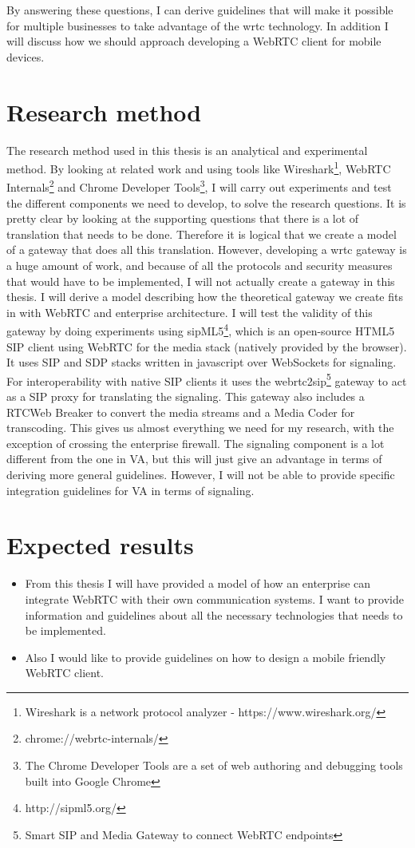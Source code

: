 By answering these questions, I can derive guidelines that will make it possible for multiple businesses to take advantage of the \gls{wrtc} technology. In addition I will discuss how we should approach developing a WebRTC client for mobile devices.


\section{Research method}
The research method used in this thesis is an analytical and experimental method. By looking at related work and using tools like Wireshark\footnote{Wireshark is a network protocol analyzer - https://www.wireshark.org/}, WebRTC Internals\footnote{chrome://webrtc-internals/} and Chrome Developer Tools\footnote{The Chrome Developer Tools are a set of web authoring and debugging tools built into Google Chrome}, I will carry out experiments and test the different components we need to develop, to solve the research questions. It is pretty clear by looking at the supporting questions that there is a lot of translation that needs to be done. Therefore it is logical that we create a model of a gateway that does all this translation. However, developing a \gls{wrtc} gateway is a huge amount of work, and because of all the protocols and security measures that would have to be implemented, I will not actually create a gateway in this thesis. I will derive a model describing how the theoretical gateway we create fits in with WebRTC and enterprise architecture. I will test the validity of this gateway by doing experiments using sipML5\footnote{http://sipml5.org/}, which is an open-source HTML5 SIP client using WebRTC for the media stack (natively provided by the browser). It uses SIP and SDP stacks written in javascript over WebSockets for signaling. For interoperability with native SIP clients it uses the webrtc2sip\footnote{Smart SIP and Media Gateway to connect WebRTC endpoints} gateway to act as a SIP proxy for translating the signaling. This gateway also includes a RTCWeb Breaker to convert the media streams and a Media Coder for transcoding. This gives us almost everything we need for my research, with the exception of crossing the enterprise firewall. The signaling component is a lot different from the one in VA, but this will just give an advantage in terms of deriving more general guidelines. However, I will not be able to provide specific integration guidelines for VA in terms of signaling.

\section{Expected results}

\begin{itemize}
    \item From this thesis I will have provided a model of how an enterprise can integrate WebRTC with their own communication systems. I want to provide information and guidelines about all the necessary technologies that needs to be implemented.
    \item Also I would like to provide guidelines on how to design a mobile friendly WebRTC client.
\end{itemize}
